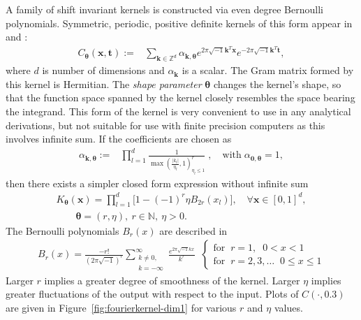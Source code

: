 \documentclass{iitthesis}          %
\newcommand{\bm}[1]{\boldsymbol{#1}}
\newcommand{\naturals}{\mathbb{N}}
\newcommand{\vtheta}{{\bm{\theta}}}
\newcommand{\vk}{\bm{k}}
\newcommand{\vt}{\bm{t}}
\newcommand{\vx}{\bm{x}}
\newcommand\figref{Figure~\ref}
\begin{document}
A family of shift invariant kernels is constructed via even degree Bernoulli polynomials. Symmetric, periodic, positive definite kernels of this form appear in  \cite{DicEtal14a} and \cite{Hic96a}:
\begin{align*}
C_\vtheta(\vx, \vt) := &  \sum_{\vk \in \mathbb{Z}^d} \alpha_{\vk,\vtheta}  e^{2 \pi\sqrt{-1} \vk^T\vx}
e^{-2 \pi\sqrt{-1} \vk^T\vt},
\end{align*}
where $d$ is number of dimensions and $\alpha_{\vk}$ is a scalar. The Gram matrix formed by this kernel is Hermitian. 
The \textit{shape parameter} $\vtheta$ changes the kernel's shape, so that the function space spanned by the kernel closely resembles the space bearing the integrand. 
This form of the kernel is very convenient to use in any analytical derivations, but not suitable for use with finite precision computers as this involves infinite sum. 
If the coefficients are chosen as 
\begin{align*}
\alpha_{\vk,\vtheta} := & \prod_{l=1}^d \frac{1}{\max(\frac{|k_l|}{\eta_l},1)^r_{\eta_l\leq 1}}  \;,  \quad \text{with} \; {\alpha}_{\bm{0},\vtheta} = 1,
\end{align*}
then there exists a simpler closed form expression without infinite sum
\begin{align}
\label{the_kernel_eqn_bernoulli}
K_\vtheta(\vx) =
\prod_{l=1}^d \biggl[
1 - (-1)^{r} \eta B_{2r}( {x_l} ) \biggr], \quad  
\forall \vx \in [0,1]^d, \\ \qquad  \vtheta = (r,\eta), \ r \in \naturals, \ \eta > 0.
\end{align}
The Bernoulli polynomials $B_{r}(x)$ are described in \cite[Chapter 24]{OlvEtal10a}
\begin{align*}
B_{r}(x) = \frac{-r!}{(2 \pi \sqrt{-1})^{r}} 
\sum_{\substack{k \neq 0,\\ k=-\infty}}^\infty 
\frac{e^{2\pi\sqrt{-1} k x}}{k^{r}}
\;\;
\begin{cases}
\text{for} \;\; r=1, \;\; 0 < x < 1 \\
\text{for} \;\; r=2,3,\hdots \;\; 0 \leq x \leq 1
\end{cases}
\end{align*}
Larger $r$ implies a greater degree of smoothness of the kernel.  Larger $\eta$ implies greater fluctuations of the output with respect to the input.  Plots of $C(\cdot, 0.3)$ are given in \figref{fig:fourierkernel-dim1} for various $r$ and $\eta$ values.
\end{document}
